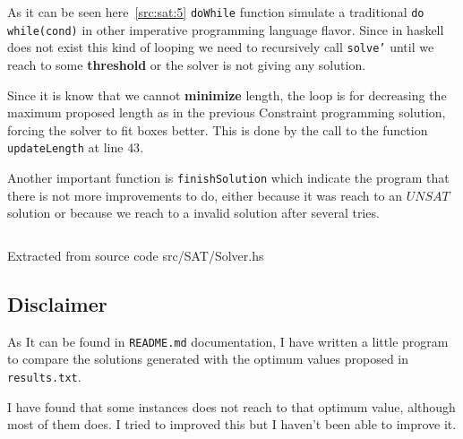 \documentclass[12pt, a4paper]{article}
\begin{document}
As it can be seen here~\ref{src:sat:5} \texttt{doWhile} function simulate a traditional \texttt{do   while(cond)} in other imperative programming language flavor. Since in \acrshort{haskell} does not exist this kind of looping we need to recursively call \texttt{solve'} until we reach to some \textbf{threshold} or the solver is not giving any solution.

Since it is know that we cannot \textbf{minimize} length, the loop is for decreasing the maximum proposed length as in the previous Constraint programming solution, forcing the solver to fit boxes better. This is done by the call to the function \texttt{updateLength} at line $43$.

Another important function is \texttt{finishSolution} which indicate the program that there is not more improvements to do, either because it was reach to an $UNSAT$ solution or because we reach to a invalid solution after several tries.

\begin{listing}[H]
  \inputminted[firstline=51, lastline=57, linenos, breaklines]{haskell}{../src/SAT/Solver.hs}
  \caption{Extracted from source code src/SAT/Solver.hs}
  \label{src:sat:6}
\end{listing}



\subsection{Disclaimer}
As It can be found in \texttt{README.md} documentation, I have written a little program to compare the solutions generated with the optimum values proposed in \texttt{results.txt}.

I have found that some instances does not reach to that optimum value, although most of them does. I tried to improved this but I haven't been able to improve it.



\end{document}
